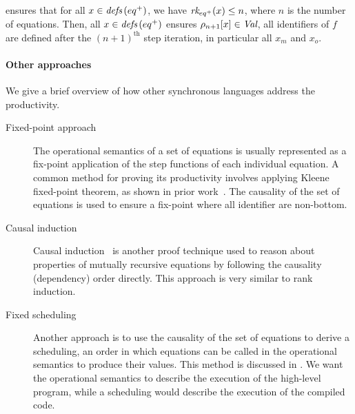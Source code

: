 \begin{skippableproof}
     ensures that for all $x \in {\ensuremath{\textit{defs}\left(eq^+\right)}}$,
    we have ${\textit{rk}_{eq^+}(x)} \le n$, where $n$ is the number of equations. Then, all
    $x \in {\ensuremath{\textit{defs}\left(eq^+\right)}}$ ensures $\rho_{n+1}[x] \in \textit{Val}$,
    \ie all identifiers of $f$ are defined after the $(n+1)^\text{th}$ step iteration, in particular
    all $x_m$ and $x_o$.

    \paragraph{Other approaches}
    We give a brief overview of how other synchronous languages address the productivity.

    \begin{description}
        \item[Fixed-point approach]
              The operational semantics of a set of equations is usually represented as a fix-point
              application of the step functions of each individual equation.
              A common method for proving its productivity involves applying Kleene fixed-point theorem, as
              shown in prior work~\cite{DBLP:journals/tecs/ColacoMPP23}.
              The causality of the set of equations is used to ensure a fix-point where all identifier are
              non-bottom.

        \item[Causal induction]
              Causal induction~\cite{bourke:hal-03936656} is another proof technique used to reason about
              properties of mutually recursive equations by following the causality (dependency) order
              directly. This approach is very similar to rank induction.

        \item[Fixed scheduling]
              Another approach is to use the causality of the set of equations to derive a scheduling,
              an order in which equations can be called in the operational semantics to produce their values.
              This method is discussed in .
              We want the operational semantics to describe the execution of the high-level program,
              while a scheduling would describe the execution of the compiled code.
    \end{description}

    \setcounter{paragraph}{0}
\end{skippableproof}

